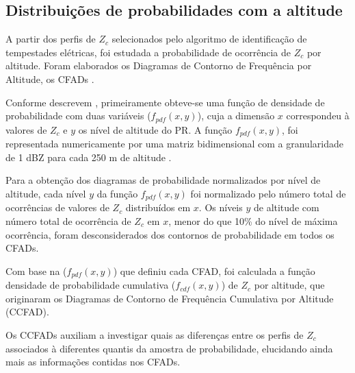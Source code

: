 \subsection{Distribuições de probabilidades com a altitude}

A partir dos perfis de $Z_c$ selecionados pelo algoritmo de identificação de tempestades elétricas, foi estudada a probabilidade de ocorrência de $Z_c$ por altitude. Foram elaborados os Diagramas de Contorno de Frequência por Altitude, os CFADs \cite{yuter1995}.

Conforme descrevem , primeiramente obteve-se uma função de densidade de probabilidade com duas variáveis ($f_{pdf}(x,y)$), cuja a dimensão $x$ correspondeu à valores de $Z_{c}$ e $y$ os nível de altitude do PR. A função $f_{pdf}(x,y)$, foi representada numericamente por uma matriz bidimensional com a granularidade de 1 dBZ para cada 250 m de altitude \cite{yuter1995}.



Para a obtenção dos diagramas de probabilidade normalizados por nível de altitude, cada nível $y$ da função $f_{pdf}(x,y)$ foi normalizado pelo número total de ocorrências de valores de $Z_c$ distribuídos em $x$. Os níveis $y$ de altitude com número total de ocorrência de $Z_c$ em $x$, menor do que 10\% do nível de máxima ocorrência, foram desconsiderados dos contornos de probabilidade em todos os CFADs.

Com base na ($f_{pdf}(x,y)$) que definiu cada CFAD, foi calculada a função densidade de probabilidade cumulativa ($f_{cdf}(x,y)$) de $Z_c$ por altitude, que originaram os Diagramas de Contorno de Frequência Cumulativa por Altitude (CCFAD).     



Os CCFADs auxiliam a investigar quais as diferenças entre os perfis de $Z_c$ associados à diferentes quantis da amostra de probabilidade, elucidando ainda mais as informações contidas nos CFADs.





